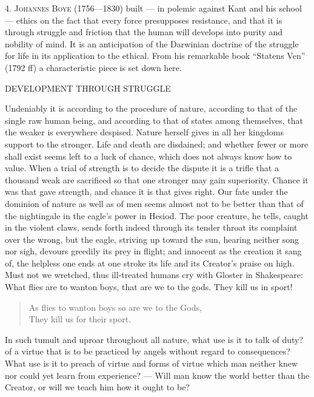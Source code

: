 \documentclass[12pt,a4paper,openany]{book}
\newcommand{\opage}[1]{\marginnote{\footnotesize\textit{[#1]}}}
\newcommand{\excerpthead}[1]{\par\bigskip\begin{center}#1\end{center}\nopagebreak\smallskip}
\newenvironment{intro}{\par}{\par}
\begin{document}
\begin{intro}

\setcounter{footnote}{0}%
\opage{40}4. \textsc{Johannes Boye} (1756---1830) built --- in polemic against Kant
and his school --- ethics on the fact that every force presupposes resistance, and
that it is through struggle and friction that the human will develops into purity
and nobility of mind. It is an anticipation of the Darwinian doctrine of the
struggle for life in its application to the ethical. From his remarkable book
``Statens Ven'' (1792 ff) a characteristic piece is set down here.
\end{intro}

\excerpthead{DEVELOPMENT THROUGH STRUGGLE}


Undeniably it is according to the procedure of nature, according to that of the
single raw human being, and according to that of states among themselves, that the
weaker is everywhere despised. Nature herself gives in all her kingdoms support to
the stronger. Life and death are disdained; and whether fewer or more shall exist
seems left to a luck of chance, which does not always know how to value. When a
trial of strength is to decide the dispute it is a trifle that a thousand weak are
sacrificed so that one stronger may gain superiority. Chance it was that gave
strength, and chance it is that gives right. Our fate under the dominion of nature
as well as of men seems almost not to be better than that of the nightingale in
the eagle's power in Hesiod. The poor creature, he tells, caught in the violent
claws, sends forth indeed through its tender throat its complaint over the wrong,
but the eagle, striving up toward the sun, hearing neither song nor sigh, devours
greedily its prey in flight; and innocent as the creation it sang of, the helpless
one ends at one stroke its life and its Creator's praise on high. Must not we
wretched, thus ill-treated humans cry with Gloster in Shakespeare: What flies are
to wanton boys, that are we to the gods. They kill us in sport!

\begin{quote}
As flies to wanton boys so are we to the Gods,\\
They kill us for their sport.
\end{quote}

In such tumult and uproar throughout all nature, what
\setcounter{footnote}{0}%
\opage{41}use is it to talk of duty? of a virtue that is to be practiced by angels
without regard to consequences? What use is it to preach of virtue and forms of
virtue which man neither knew nor could yet learn from experience? --- Will man
know the world better than the Creator, or will we teach him how it ought to be?
\end{document}
